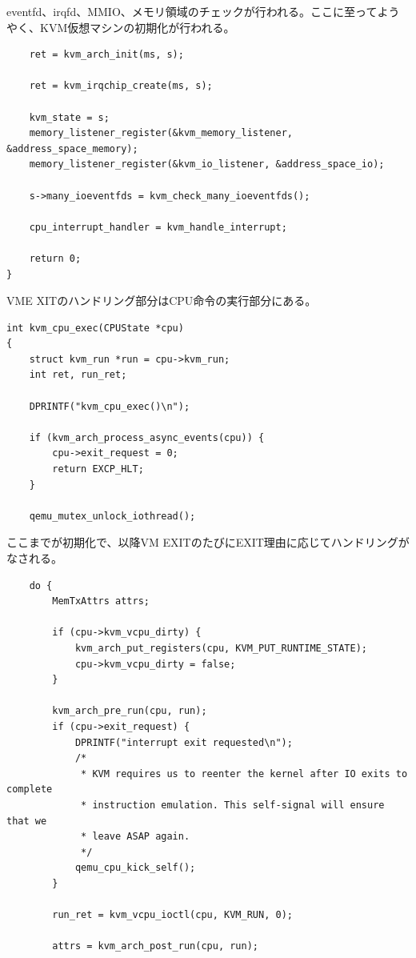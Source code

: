 ﻿\documentclass[9pt,b5paper,tombo,openany]{jsbook}
\begin{document}
eventfd、irqfd、MMIO、メモリ領域のチェックが行われる。ここに至ってようやく、KVM仮想マシンの初期化が行われる。

\begin{lstlisting}
    ret = kvm_arch_init(ms, s);

    ret = kvm_irqchip_create(ms, s);

    kvm_state = s;
    memory_listener_register(&kvm_memory_listener, &address_space_memory);
    memory_listener_register(&kvm_io_listener, &address_space_io);

    s->many_ioeventfds = kvm_check_many_ioeventfds();

    cpu_interrupt_handler = kvm_handle_interrupt;

    return 0;
}
\end{lstlisting}

VME XITのハンドリング部分はCPU命令の実行部分にある。

\begin{lstlisting}
int kvm_cpu_exec(CPUState *cpu)
{
    struct kvm_run *run = cpu->kvm_run;
    int ret, run_ret;

    DPRINTF("kvm_cpu_exec()\n");

    if (kvm_arch_process_async_events(cpu)) {
        cpu->exit_request = 0;
        return EXCP_HLT;
    }

    qemu_mutex_unlock_iothread();
\end{lstlisting}

ここまでが初期化で、以降VM EXITのたびにEXIT理由に応じてハンドリングがなされる。

\begin{lstlisting}
    do {
        MemTxAttrs attrs;

        if (cpu->kvm_vcpu_dirty) {
            kvm_arch_put_registers(cpu, KVM_PUT_RUNTIME_STATE);
            cpu->kvm_vcpu_dirty = false;
        }

        kvm_arch_pre_run(cpu, run);
        if (cpu->exit_request) {
            DPRINTF("interrupt exit requested\n");
            /*
             * KVM requires us to reenter the kernel after IO exits to complete
             * instruction emulation. This self-signal will ensure that we
             * leave ASAP again.
             */
            qemu_cpu_kick_self();
        }

        run_ret = kvm_vcpu_ioctl(cpu, KVM_RUN, 0);

        attrs = kvm_arch_post_run(cpu, run);
\end{lstlisting}
\end{document}

